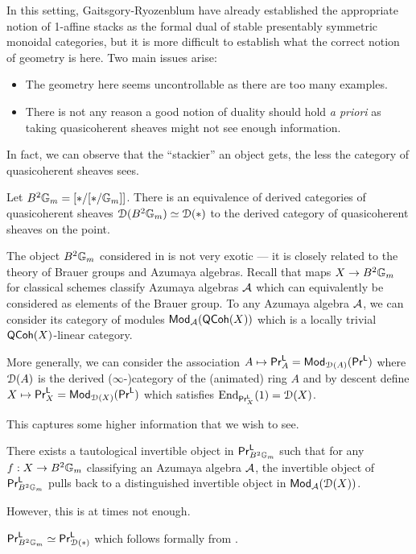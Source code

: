 In this setting, Gaitsgory-Ryozenblum have already established the appropriate notion of 1-affine stacks as the formal dual of stable presentably symmetric monoidal categories, but it is more difficult to establish what the correct notion of geometry is here. Two main issues arise: 
\begin{itemize}
    \item The geometry here seems uncontrollable as there are too many examples. 
    \item There is not any reason a good notion of duality should hold \emph{a priori} as taking quasicoherent sheaves might not see enough information. 
\end{itemize}
In fact, we can observe that the ``stackier'' an object gets, the less the category of quasicoherent sheaves sees. 
\begin{example}\label{ex: B2Gm}
    Let $B^{2}\mathbb{G}_{m}=[*/[*/\mathbb{G}_{m}]]$. There is an equivalence of derived categories of quasicoherent sheaves $\EuScript{D}(B^{2}\mathbb{G}_{m})\simeq\EuScript{D}(*)$ to the derived category of quasicoherent sheaves on the point. 
\end{example}
The object $B^{2}\mathbb{G}_{m}$ considered in  is not very exotic --- it is closely related to the theory of Brauer groups and Azumaya algebras. Recall that maps $X\to B^{2}\mathbb{G}_{m}$ for classical schemes classify Azumaya algebras $\mathcal{A}$ which can equivalently be considered as elements of the Brauer group. To any Azumaya algebra $\mathcal{A}$, we can consider its category of modules $\mathsf{Mod}_{\mathcal{A}}(\mathsf{QCoh}(X))$ which is a locally trivial $\mathsf{QCoh}(X)$-linear category. 

More generally, we can consider the association $A\mapsto\mathsf{Pr}^{\mathsf{L}}_{A}=\mathsf{Mod}_{\EuScript{D}(A)}(\mathsf{Pr}^{\mathsf{L}})$ where $\EuScript{D}(A)$ is the derived ($\infty$-)category of the (animated) ring $A$ and by descent define $X\mapsto\mathsf{Pr}^{\mathsf{L}}_{X}=\mathsf{Mod}_{\EuScript{D}(X)}(\mathsf{Pr}^{\mathsf{L}})$ which satisfies $\mathrm{End}_{\mathsf{Pr}^{\mathsf{L}}_{X}}(1)=\EuScript{D}(X)$. 

This captures some higher information that we wish to see. 
\begin{example}
    There exists a tautological invertible object in $\mathsf{Pr}^{\mathsf{L}}_{B^{2}\mathbb{G}_{m}}$ such that for any $f:X\to B^{2}\mathbb{G}_{m}$ classifying an Azumaya algebra $\mathcal{A}$, the invertible object of $\mathsf{Pr}^{\mathsf{L}}_{B^{2}\mathbb{G}_{m}}$ pulls back to a distinguished invertible object in $\mathsf{Mod}_{\mathcal{A}}(\EuScript{D}(X))$. 
\end{example}
However, this is at times not enough. 
\begin{example}
    $\mathsf{Pr}^{\mathsf{L}}_{B^{2}\mathbb{G}_{m}}\simeq\mathsf{Pr}^{\mathsf{L}}_{\EuScript{D}(*)}$ which follows formally from . 
\end{example}

